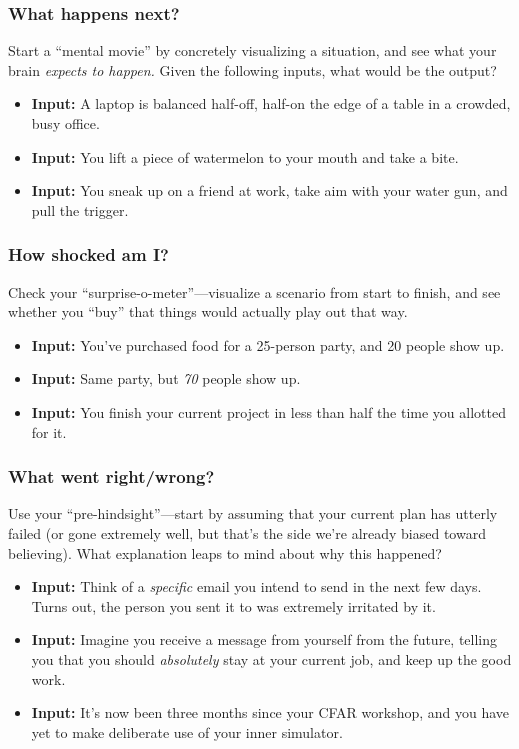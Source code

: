 \subsubsection{What happens next?}
Start a ``mental movie'' by concretely visualizing a situation, and see what your brain \emph{expects to happen.}  Given the following inputs, what would be the output?
\begin{itemize}
	\item \textbf{Input:} A laptop is balanced half-off, half-on the edge of a table in a crowded, busy office.
	\item \textbf{Input:} You lift a piece of watermelon to your mouth and take a bite.
	\item \textbf{Input:} You sneak up on a friend at work, take aim with your water gun, and pull the trigger.
\end{itemize}

\subsubsection{How shocked am I?}
Check your ``surprise-o-meter''---visualize a scenario from start to finish, and see whether you ``buy'' that things would actually play out that way.
\begin{itemize}
	\item \textbf{Input:} You've purchased food for a 25-person party, and 20 people show up.
	\item \textbf{Input:} Same party, but \emph{70} people show up.
	\item \textbf{Input:} You finish your current project in less than half the time you allotted for it.
\end{itemize}

\subsubsection{What went right/wrong?}
Use your ``pre-hindsight''---start by assuming that your current plan has utterly failed (or gone extremely well, but that's the side we're already biased toward believing).  What explanation leaps to mind about why this happened?
\begin{itemize}
	\item \textbf{Input:} Think of a \emph{specific} email you intend to send in the next few days.  Turns out, the person you sent it to was extremely irritated by it.
	\item \textbf{Input:} Imagine you receive a message from yourself from the future, telling you that you should \emph{absolutely} stay at your current job, and keep up the good work.
	\item \textbf{Input:} It's now been three months since your CFAR workshop, and you have yet to make deliberate use of your inner simulator.
\end{itemize}
\clearpage

